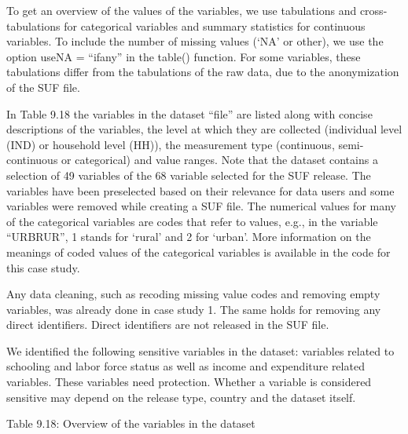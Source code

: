 \documentclass[letterpaper,10pt,english]{sphinxmanual}
\begin{document}
To get an overview of the values of the variables, we use tabulations
and cross-tabulations for categorical variables and summary statistics
for continuous variables. To include the number of missing values (‘NA’
or other), we use the option useNA = “ifany” in the table() function.
For some variables, these tabulations differ from the tabulations of the
raw data, due to the anonymization of the SUF file.

In Table 9.18 the variables in the dataset “file” are listed along with
concise descriptions of the variables, the level at which they are
collected (individual level (IND) or household level (HH)), the
measurement type (continuous, semi-continuous or categorical) and value
ranges. Note that the dataset contains a selection of 49 variables of
the 68 variable selected for the SUF release. The variables have been
preselected based on their relevance for data users and some variables
were removed while creating a SUF file. The numerical values for many of
the categorical variables are codes that refer to values, e.g., in the
variable “URBRUR”, 1 stands for ‘rural’ and 2 for ‘urban’. More
information on the meanings of coded values of the categorical variables
is available in the  code for this case study.

Any data cleaning, such as recoding missing value codes and removing
empty variables, was already done in case study 1. The same holds for
removing any direct identifiers. Direct identifiers are not released in
the SUF file.

We identified the following sensitive variables in the dataset:
variables related to schooling and labor force status as well as income
and expenditure related variables. These variables need protection.
Whether a variable is considered sensitive may depend on the release
type, country and the dataset itself.

Table 9.18: Overview of the variables in the dataset
\end{document}
